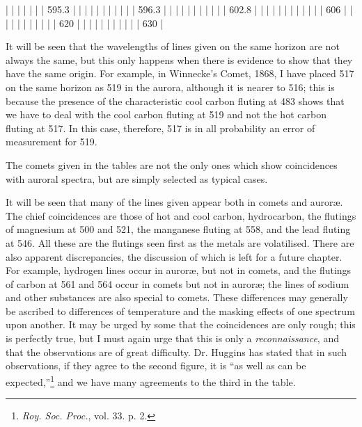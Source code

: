 \documentclass[a4paper, 12pt, oneside, polutonikogreek, english]{article}
\begin{document}
|            |             |                 |              |             |         | 595.3           |         |              |            |
|            |             |                 |              |             |         | 596.3           |         |              |            |
|            |             |                 |              |             |         | 602.8           |         |              |            |
|            |             |                 |              |             |         |              | 606       |              |            |
|            |             |                 |              |             |         |              | 620       |              |            |
|            |             |                 |              |             |         |              | 630       |

It will be seen that the wavelengths of lines given on the same horizon are not always the same, but this only happens when there is evidence to show that they have the same origin. For example, in Winnecke's Comet, 1868, I have placed 517 on the same horizon as 519 in the aurora, although it is nearer to 516; this is because the presence of the characteristic cool carbon fluting at 483 shows that we have to deal with the cool carbon fluting at 519 and not the hot carbon fluting at 517. In this case, therefore, 517 is in all probability an error of measurement for 519.

The comets given in the tables are not the only ones which show coincidences with auroral spectra, but are simply selected as typical cases.

It will be seen that many of the lines given appear both in comets and auroræ. The chief coincidences are those of hot and cool carbon, hydrocarbon, the flutings of magnesium at 500 and 521, the manganese fluting at 558, and the lead fluting at 546. All these are the flutings seen first as the metals are volatilised. There are also apparent discrepancies, the discussion of which is left for a future chapter. For example, hydrogen lines occur in auroræ, but not in comets, and the flutings of carbon at 561 and 564 occur in comets but not in auroræ; the lines of sodium and other substances are also special to comets. These differences may generally be ascribed to differences of temperature and the masking effects of one spectrum upon another. It may be urged by some that the coincidences are only rough; this is perfectly true, but I must again urge that this is only a \emph{reconnaissance}, and that the observations are of great difficulty. Dr. Huggins has stated that in such observations, if they agree to the second figure, it is ``as well as can be expected,''\footnote{\emph{Roy. Soc. Proc.}, vol. 33. p. 2.} and we have many agreements to the third in the table.
\end{document}
